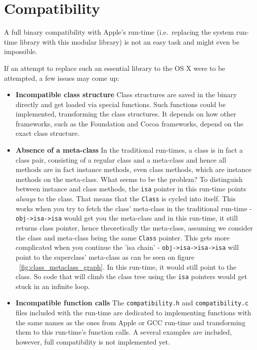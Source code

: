  

\section{Compatibility}

A full binary compatibility with Apple's run-time (i.e.\ replacing the system run-time library with this modular library) is not an easy task and might even be impossible.

If an attempt to replace such an essential library to the OS X were to be attempted, a few issues may come up:

\begin{itemize}
  \item{\bf{Incompatible class structure}} Class structures are saved in the binary directly and get loaded via special functions. Such functions could be implemented, transforming the class structures. It depends on how other frameworks, such as the Foundation and Cocoa frameworks, depend on the exact class structure.
  \item{\bf{Absence of a meta-class}} In the traditional run-times, a class is in fact a class pair, consisting of a regular class and a meta-class and hence all methods are in fact instance methods, even class methods, which are instance methods on the meta-class. What seems to be the problem? To distinguish between instance and class methods, the \verb=isa= pointer in this run-time points \emph{always} to the class. That means that the \verb=Class= is cycled into itself. This works when you try to fetch the class' meta-class in the traditional run-time - \verb=obj->isa->isa= would get you the meta-class and in this run-time, it still returns class pointer, hence theoretically the meta-class, assuming we consider the class and meta-class being the same \verb=Class= pointer. This gets more complicated when you continue the 'isa chain' - \verb=obj->isa->isa->isa= will point to the superclass' meta-class as can be seen on figure ~\ref{fig:class_metaclass_graph}. In this run-time, it would still point to the class. So code that will climb the class tree using the \verb=isa= pointers would get stuck in an infinite loop.
  \item{\bf{Incompatible function calls}} The \verb=compatibility.h= and \verb=compatibility.c= files included with the run-time are dedicated to implementing functions with the same names as the ones from Apple or GCC run-time and transforming them to this run-time's function calls. A several examples are included, however, full compatibility is not implemented yet.
\end{itemize}

